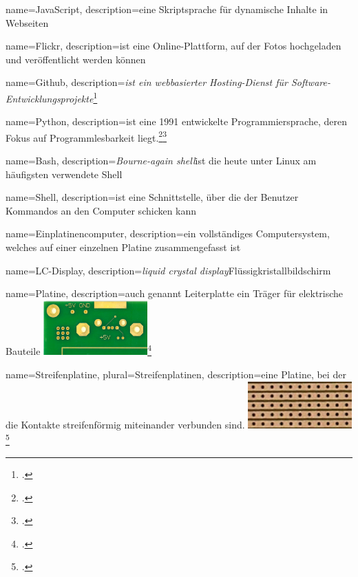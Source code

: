 
{
  name=JavaScript,
  description={eine Skriptsprache für dynamische Inhalte in Webseiten}
}

{
  name=Flickr,
  description={ist eine Online-Plattform, auf der Fotos hochgeladen und veröffentlicht werden können}
}

{
  name=Github,
  description={\emph{ist ein webbasierter Hosting-Dienst für Software-Entwicklungsprojekte}\footcite{wiki:github}}
}

{
  name=Python,
  description={ist eine 1991 entwickelte Programmiersprache, deren Fokus auf Programmlesbarkeit liegt.\footcite{python}\footcite{python_manual}{}}
}

{
  name=Bash,
  description={\textit{Bourne-again shell}\newline ist die heute unter Linux am häufigsten verwendete \gls{Shell}}
}

{
  name=Shell,
  description={ist eine Schnittstelle, über die der Benutzer Kommandos an den Computer schicken kann}
}

{
  name=Einplatinencomputer,
  description={ein vollständiges Computersystem, welches auf einer einzelnen Platine zusammengefasst ist}
}

{
  name=LC-Display,
  description={\emph{liquid crystal display}\newline Flüssigkristallbildschirm}
}

{
  name=Platine,
  description={auch genannt Leiterplatte\newline
  ein Träger für elektrische Bauteile\newline
  \includegraphics[width=4cm]{figures/platine.png}\footcite{platine}
    	}
}

{
  name=Streifenplatine,
  plural=Streifenplatinen,
  description={eine \gls{Platine}, bei der die Kontakte streifenförmig miteinander verbunden sind.\newline
  \includegraphics[width=4cm]{figures/streifenplatine.png}\footcite{streifenplatine}
  	}
}

